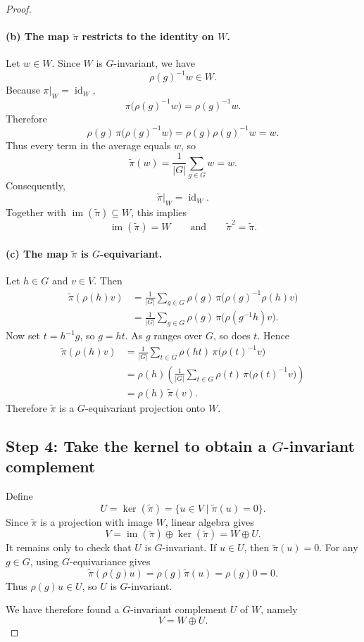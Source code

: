 \documentclass[12pt,a4paper]{ctexart}
\theoremstyle{remark}
\begin{document}
\begin{proof}
\paragraph{(b) The map \(\widetilde{\pi}\) restricts to the identity on \(W\).}
Let \(w\in W\). Since \(W\) is \(G\)-invariant, we have
\[
  \rho(g)^{-1}w\in W.
\]
Because \(\pi|_W=\operatorname{id}_W\),
\[
  \pi\bigl(\rho(g)^{-1}w\bigr)=\rho(g)^{-1}w.
\]
Therefore
\[
  \rho(g)\,\pi\bigl(\rho(g)^{-1}w\bigr)
  =
  \rho(g)\rho(g)^{-1}w
  =
  w.
\]
Thus every term in the average equals \(w\), so
\[
  \widetilde{\pi}(w)
  =
  \frac{1}{|G|}
  \sum_{g\in G} w
  =
  w.
\]
Consequently,
\[
  \widetilde{\pi}|_W=\operatorname{id}_W.
\]
Together with \(\operatorname{im}(\widetilde{\pi})\subseteq W\), this implies
\[
  \operatorname{im}(\widetilde{\pi})=W
  \qquad\text{and}\qquad
  \widetilde{\pi}^2=\widetilde{\pi}.
\]

\paragraph{(c) The map \(\widetilde{\pi}\) is \(G\)-equivariant.}
Let \(h\in G\) and \(v\in V\). Then
\[
\begin{aligned}
  \widetilde{\pi}(\rho(h)v)
  &=
  \frac{1}{|G|}
  \sum_{g\in G}
  \rho(g)\,\pi\bigl(\rho(g)^{-1}\rho(h)v\bigr) \\
  &=
  \frac{1}{|G|}
  \sum_{g\in G}
  \rho(g)\,\pi\bigl(\rho(g^{-1}h)v\bigr).
\end{aligned}
\]
Now set \(t=h^{-1}g\), so \(g=ht\). As \(g\) ranges over \(G\), so does
\(t\). Hence
\[
\begin{aligned}
  \widetilde{\pi}(\rho(h)v)
  &=
  \frac{1}{|G|}
  \sum_{t\in G}
  \rho(ht)\,\pi\bigl(\rho(t)^{-1}v\bigr) \\
  &=
  \rho(h)
  \left(
  \frac{1}{|G|}
  \sum_{t\in G}
  \rho(t)\,\pi\bigl(\rho(t)^{-1}v\bigr)
  \right) \\
  &=
  \rho(h)\,\widetilde{\pi}(v).
\end{aligned}
\]
Therefore \(\widetilde{\pi}\) is a \(G\)-equivariant projection onto \(W\).

\subsection*{Step 4: Take the kernel to obtain a \(G\)-invariant complement}

Define
\[
  U=\ker(\widetilde{\pi})
  =
  \{u\in V\mid \widetilde{\pi}(u)=0\}.
\]
Since \(\widetilde{\pi}\) is a projection with image \(W\), linear algebra gives
\[
  V=\operatorname{im}(\widetilde{\pi})\oplus\ker(\widetilde{\pi})
  =
  W\oplus U.
\]
It remains only to check that \(U\) is \(G\)-invariant. If \(u\in U\), then
\(\widetilde{\pi}(u)=0\). For any \(g\in G\), using \(G\)-equivariance gives
\[
  \widetilde{\pi}(\rho(g)u)
  =
  \rho(g)\widetilde{\pi}(u)
  =
  \rho(g)0
  =
  0.
\]
Thus \(\rho(g)u\in U\), so \(U\) is \(G\)-invariant.

We have therefore found a \(G\)-invariant complement \(U\) of \(W\), namely
\[
  V=W\oplus U.
\]
\end{proof}
\end{document}
